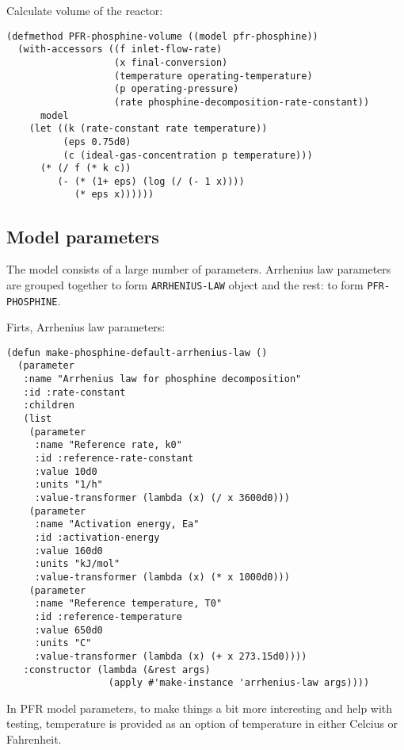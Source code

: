 \documentclass[listings, a4paper, fleqn, pdftex, 12pt, openany, oneside, final]{memoir}
\theoremstyle{definition}
\begin{document}
Calculate volume of the reactor:

\begin{verbatim}
(defmethod PFR-phosphine-volume ((model pfr-phosphine))
  (with-accessors ((f inlet-flow-rate)
                   (x final-conversion)
                   (temperature operating-temperature)
                   (p operating-pressure)
                   (rate phosphine-decomposition-rate-constant))
      model
    (let ((k (rate-constant rate temperature))
          (eps 0.75d0)
          (c (ideal-gas-concentration p temperature)))
      (* (/ f (* k c))
         (- (* (1+ eps) (log (/ (- 1 x))))
            (* eps x))))))
\end{verbatim}

\subsection{Model parameters}
\label{sec:orgheadline5}
The model consists of a large number of parameters. Arrhenius law
parameters are grouped together to form \texttt{ARRHENIUS-LAW} object and the
rest: to form \texttt{PFR-PHOSPHINE}.

Firts, Arrhenius law parameters:

\begin{verbatim}
(defun make-phosphine-default-arrhenius-law ()
  (parameter
   :name "Arrhenius law for phosphine decomposition"
   :id :rate-constant
   :children
   (list
    (parameter
     :name "Reference rate, k0"
     :id :reference-rate-constant
     :value 10d0
     :units "1/h"
     :value-transformer (lambda (x) (/ x 3600d0)))
    (parameter
     :name "Activation energy, Ea"
     :id :activation-energy
     :value 160d0
     :units "kJ/mol"
     :value-transformer (lambda (x) (* x 1000d0)))
    (parameter
     :name "Reference temperature, T0"
     :id :reference-temperature
     :value 650d0
     :units "C"
     :value-transformer (lambda (x) (+ x 273.15d0))))
   :constructor (lambda (&rest args)
                  (apply #'make-instance 'arrhenius-law args))))
\end{verbatim}

In PFR model parameters, to make things a bit more interesting and
help with testing, temperature is provided as an option of temperature
in either Celcius or Fahrenheit.
\end{document}
